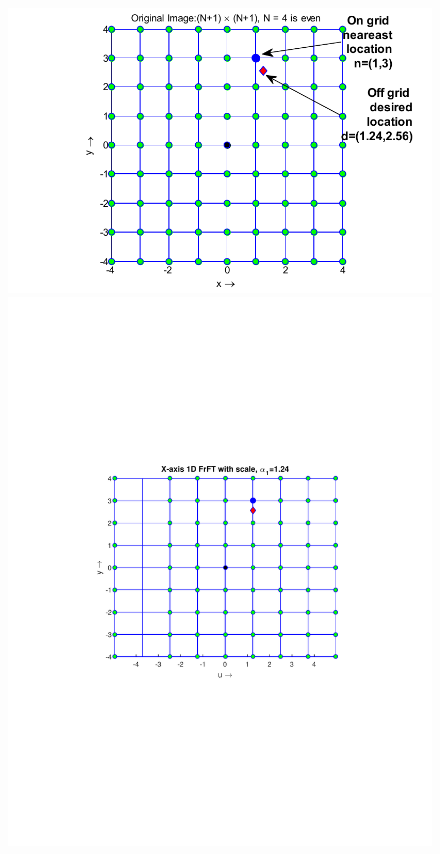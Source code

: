 \documentclass{UCF_ETD}
\begin{document}
 \begin{figure}[H]
 \begin{center}
 \includegraphics[scale=.9]{PolarSphericalDFT/UniformGrid}
 \includegraphics[scale=0.6]{PolarSphericalDFT/XAxisScaledGrid}

\end{center}
\end{figure}
\end{document}

